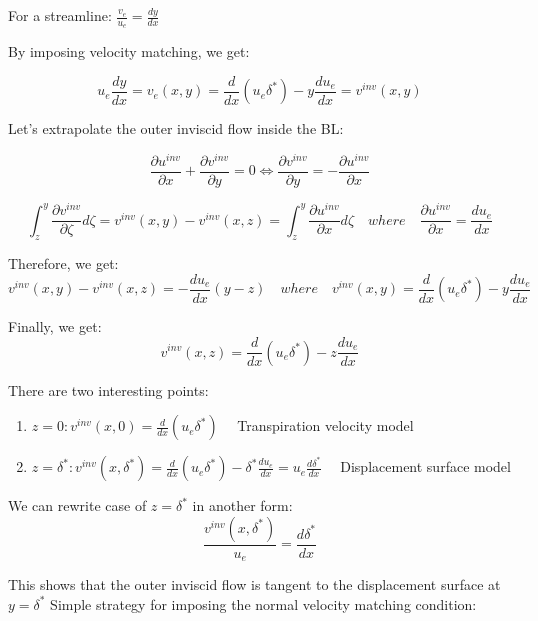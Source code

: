 For a streamline: $  \frac{v_e}{u_e}=\frac{d y}{d x}$

By imposing velocity matching, we get:

\begin{equation}
u_e\frac{d y}{d x}=v_e(x,y)=\frac{d}{d x} (u_e\delta^*)-y\frac{d u_e}{d x}=v^{inv}(x,y)
\end{equation}

Let's extrapolate the outer inviscid flow inside the BL:

\begin{equation}
\frac{\partial u^{inv}}{\partial x}+\frac{\partial v^{inv}}{\partial y}=0 \Leftrightarrow \frac{\partial v^{inv}}{\partial y}=-\frac{\partial u^{inv}}{\partial x} 
\end{equation}

\begin{equation}
\int_z^y \frac{\partial v^{inv}}{\partial \zeta} d\zeta=v^{inv}(x,y)-v^{inv}(x,z)=\int_z^y \frac{\partial u^{inv}}{\partial x} d\zeta \quad where \quad \frac{\partial u^{inv}}{\partial x}=\frac{d u_e}{d x}
\end{equation}

Therefore, we get:
\begin{equation}
v^{inv}(x,y)-v^{inv}(x,z)=-\frac{d u_e}{d x} (y-z) \quad where \quad v^{inv}(x,y)=\frac{d}{d x} (u_e\delta^*)-y\frac{d u_e}{d x}
\end{equation}

Finally, we get:
\begin{equation}
v^{inv}(x,z)=\frac{d}{d x} (u_e\delta^*)-z\frac{d u_e}{d x}
\end{equation}

There are two interesting points:
\begin{enumerate}
\item $z=0:
v^{inv}(x,0)=\frac{d}{d x} (u_e\delta^*) \quad$ Transpiration velocity model
\item $z=\delta^*: 
v^{inv}(x,\delta^*)=\frac{d}{d x} (u_e\delta^*)-\delta^*\frac{d u_e}{d x}= u_e \frac{d \delta^*}{d x} \quad$ Displacement surface model
\end{enumerate}

We can rewrite case of $z=\delta^*$ in another form:
\begin{equation}
\frac{v^{inv}(x,\delta^*)}{u_e}=\frac{d \delta^*}{d x}
\end{equation}

This shows that the outer inviscid flow is tangent to the displacement surface at $y=\delta^*$
 Simple strategy for imposing the normal velocity matching condition:
 
